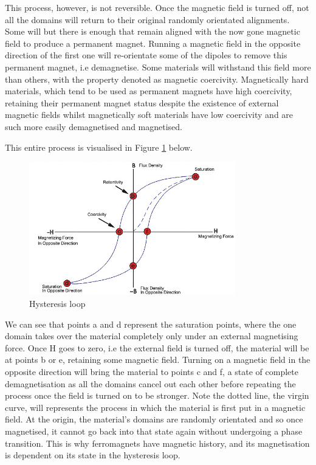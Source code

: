 \documentclass{article}
\begin{document}
This process, however, is not reversible. Once the magnetic field is turned off, not 
all the domains will return to their original randomly orientated alignments. Some will
but there is enough that remain aligned with the now gone magnetic field to produce a
permanent magnet. Running a magnetic field in the opposite direction of the first one 
will re-orientate some of the dipoles to remove this permanent magnet, i.e demagnetise.
Some materials will withstand this field more than others, with the property denoted as
magnetic coercivity. Magnetically hard materials, which tend to be used as permanent 
magnets have high coercivity, retaining their permanent magnet status despite the existence
of external magnetic fields whilst magnetically soft materials have low coercivity and are
such more easily demagnetised and magnetised.

This entire process is visualised in Figure \ref{fig:loop} below.

\begin{figure}[H]
    \centering
    \includegraphics[width=0.8\textwidth]{loop.jpeg}
    \caption{Hysteresis loop}
    \label{fig:loop}
\end{figure}

We can see that points a and d represent the saturation points, where the one domain takes
over the material completely only under an external magnetising force. Once H goes to zero, 
i.e the external field is turned off, the material will be at points b or e, retaining some 
magnetic field. Turning on a magnetic field in the opposite direction will bring the material
to points c and f, a state of complete demagnetisation as all the domains cancel out each other
before repeating the process once the field is turned on to be stronger. Note the dotted line,
the virgin curve, will represents the process in which the material is first put in a magnetic
field. At the origin, the material's domains are randomly orientated and so once magnetised, it
cannot go back into that state again without undergoing a phase transition. This is why 
ferromagnets have magnetic history, and its magnetisation is dependent on its state in the 
hysteresis loop.
\end{document}

